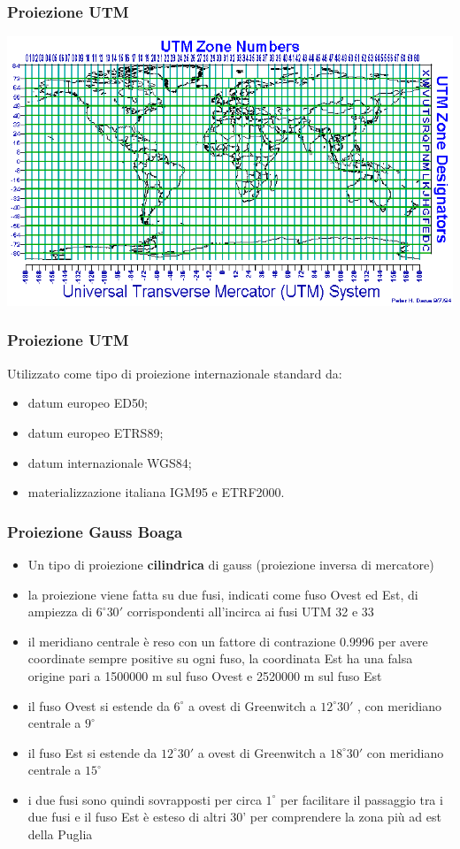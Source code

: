 \documentclass{beamer}
\begin{document}
{\begin{frame}
   \frametitle{Proiezione UTM}
	\begin{center}
		\includegraphics[width=1\textwidth] {./pics/utm_zones.png}
	\end{center}
\end{frame}

\begin{frame}
   \frametitle{Proiezione UTM}
	Utilizzato come tipo di proiezione internazionale standard da:
	\begin{itemize}
		\item datum europeo ED50;
		\item datum europeo ETRS89; 
		\item datum internazionale WGS84;
		\item materializzazione italiana IGM95 e ETRF2000.
	\end{itemize}
\end{frame}

\begin{frame}
   \frametitle{Proiezione Gauss Boaga }
	\small
	\begin{itemize}
		\item Un tipo di proiezione \textbf{cilindrica} di gauss (proiezione inversa di mercatore)
		\item la proiezione viene fatta su due fusi, indicati come fuso Ovest ed Est, di ampiezza di $ 6^{\circ} 30'$ corrispondenti all'incirca ai fusi UTM 32 e 33
		\item il meridiano centrale è reso con un fattore di contrazione 0.9996 per avere coordinate sempre positive su ogni fuso, la coordinata Est ha una falsa origine pari a 1500000 m sul fuso Ovest e 2520000 m sul fuso Est
		\item il fuso Ovest si estende da $6^{\circ}$ a ovest di Greenwitch a $ 12^{\circ} 30'$ , con meridiano centrale a $ 9^{\circ}$
		\item il fuso Est si estende da $ 12^{\circ} 30'$  a ovest di Greenwitch a $ 18^{\circ} 30'$ con meridiano centrale a $ 15^{\circ}$
		\item i due fusi sono quindi sovrapposti per circa $ 1^{\circ}$ per facilitare il passaggio tra i due fusi e il fuso Est è esteso di altri 30' per comprendere la zona più ad est della Puglia
	\end{itemize}
\end{frame}

}
\end{document}

